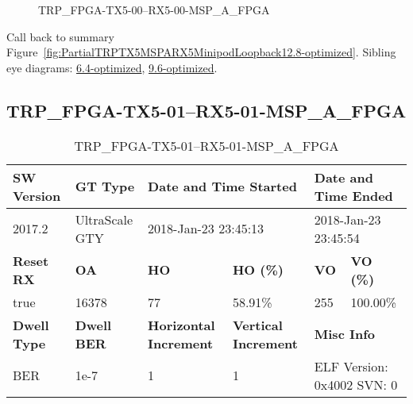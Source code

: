 \begin{figure}[h]
\caption{TRP\_FPGA-TX5-00--RX5-00-MSP\_A\_FPGA} \label{fig:TRPFPGATX500RX500MSPAFPGA12.8-optimized}
\end{figure}

Call back to summary Figure~\ref{fig:PartialTRPTX5MSPARX5MinipodLoopback12.8-optimized}.
Sibling eye diagrams: \hyperref[sec:TRPFPGATX500RX500MSPAFPGA6.4-optimized]{6.4-optimized}, \hyperref[sec:TRPFPGATX500RX500MSPAFPGA9.6-optimized]{9.6-optimized}.

\clearpage
\newpage


\subsection{TRP\_FPGA-TX5-01--RX5-01-MSP\_A\_FPGA}\label{sec:TRPFPGATX501RX501MSPAFPGA12.8-optimized}

\begin{table}[h]
\centering
\caption{TRP\_FPGA-TX5-01--RX5-01-MSP\_A\_FPGA}
\label{tab:TRPFPGATX501RX501MSPAFPGA12.8-optimized}
\begin{tabular}{@{}|l|l|l|l|l|l|@{}}
\toprule
\textbf{SW Version}                & \textbf{GT Type}   & \multicolumn{2}{l|}{\textbf{Date and Time Started}}            & \multicolumn{2}{l|}{\textbf{Date and Time Ended}}        \\ \midrule
2017.2                       & UltraScale GTY          & \multicolumn{2}{l|}{2018-Jan-23 23:45:13}                   & \multicolumn{2}{l|}{2018-Jan-23 23:45:54}               \\ \midrule
\textbf{Reset RX}                  & \textbf{OA} & \textbf{HO}   & \textbf{HO (\%)} & \textbf{VO} & \textbf{VO (\%)} \\ \midrule
true & 16378        & 77          & 58.91\%        & 255        & 100.00\%       \\ \midrule
\textbf{Dwell Type}                & \textbf{Dwell BER} & \textbf{Horizontal Increment} & \textbf{Vertical Increment}    & \multicolumn{2}{l|}{\textbf{Misc Info}}                  \\ \midrule
BER                            & 1e-7        & 1        & 1           & \multicolumn{2}{l|}{ELF Version: 0x4002 SVN: 0}                         \\ \bottomrule
\end{tabular}
\end{table}

